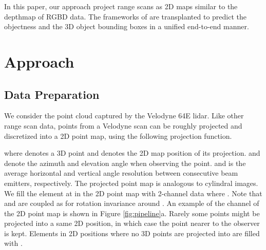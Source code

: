 \documentclass[conference]{IEEEtran}
\begin{document}
In this paper, our approach project range scans as 2D maps similar to the depthmap of RGBD data. The frameworks of \citet{Huang2015, Sermanet2013} are transplanted to predict the objectness and the 3D object bounding boxes in a unified end-to-end manner.

\section{Approach}


\subsection{Data Preparation}
We consider the point cloud captured by the Velodyne 64E lidar. Like other range scan data, points from a Velodyne scan can be roughly projected and discretized into a 2D point map, using the following projection function.

where  denotes a 3D point and  denotes the 2D map position of its projection.  and  denote the azimuth and elevation angle when observing the point.  and  is the average horizontal and vertical angle resolution between consecutive beam emitters, respectively. The projected point map is analogous to cylindral images. We fill the element at  in the 2D point map with 2-channel data  where . Note that  and  are coupled as  for rotation invariance around . An example of the  channel of the 2D point map is shown in Figure \ref{fig:pipeline}a. Rarely some points might be projected into a same 2D position, in which case the point nearer to the observer is kept. Elements in 2D positions where no 3D points are projected into are filled with . 
\end{document}

